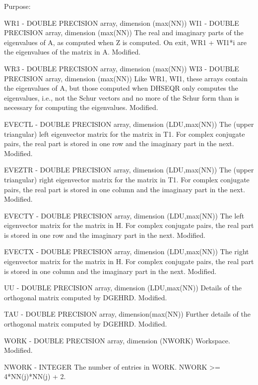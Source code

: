 \begin{DoxyParagraph}{Purpose\+: }
\begin{DoxyVerb}
  WR1    - DOUBLE PRECISION array, dimension (max(NN))
  WI1    - DOUBLE PRECISION array, dimension (max(NN))
           The real and imaginary parts of the eigenvalues of A,
           as computed when Z is computed.
           On exit, WR1 + WI1*i are the eigenvalues of the matrix in A.
           Modified.

  WR3    - DOUBLE PRECISION array, dimension (max(NN))
  WI3    - DOUBLE PRECISION array, dimension (max(NN))
           Like WR1, WI1, these arrays contain the eigenvalues of A,
           but those computed when DHSEQR only computes the
           eigenvalues, i.e., not the Schur vectors and no more of the
           Schur form than is necessary for computing the
           eigenvalues.
           Modified.

  EVECTL - DOUBLE PRECISION array, dimension (LDU,max(NN))
           The (upper triangular) left eigenvector matrix for the
           matrix in T1.  For complex conjugate pairs, the real part
           is stored in one row and the imaginary part in the next.
           Modified.

  EVEZTR - DOUBLE PRECISION array, dimension (LDU,max(NN))
           The (upper triangular) right eigenvector matrix for the
           matrix in T1.  For complex conjugate pairs, the real part
           is stored in one column and the imaginary part in the next.
           Modified.

  EVECTY - DOUBLE PRECISION array, dimension (LDU,max(NN))
           The left eigenvector matrix for the
           matrix in H.  For complex conjugate pairs, the real part
           is stored in one row and the imaginary part in the next.
           Modified.

  EVECTX - DOUBLE PRECISION array, dimension (LDU,max(NN))
           The right eigenvector matrix for the
           matrix in H.  For complex conjugate pairs, the real part
           is stored in one column and the imaginary part in the next.
           Modified.

  UU     - DOUBLE PRECISION array, dimension (LDU,max(NN))
           Details of the orthogonal matrix computed by DGEHRD.
           Modified.

  TAU    - DOUBLE PRECISION array, dimension(max(NN))
           Further details of the orthogonal matrix computed by DGEHRD.
           Modified.

  WORK   - DOUBLE PRECISION array, dimension (NWORK)
           Workspace.
           Modified.

  NWORK  - INTEGER
           The number of entries in WORK.  NWORK >= 4*NN(j)*NN(j) + 2.


\end{DoxyVerb}
\end{DoxyParagraph}
